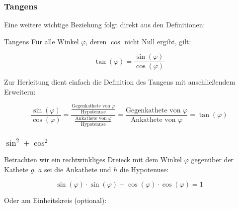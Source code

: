 \subsubsection{Tangens}
Eine weitere wichtige Beziehung folgt direkt aus den Definitionen:

\begin{gesetz}{Tangens}{}
  Für alle Winkel $\varphi$, deren $\cos$ nicht Null ergibt, gilt:

  $$\tan(\varphi) = \frac{\sin(\varphi)}{\cos(\varphi)}$$
  \end{gesetz}
Zur Herleitung dient einfach die Definition des Tangens mit
anschließendem Erweitern:

$$
\frac{\sin(\varphi)}{\cos(\varphi)}
=
\frac{\frac{\text{Gegenkathete von }
    \varphi}{\text{Hypotenuse}}}{\frac{\text{Ankathete von }\varphi}{\text{Hypotenuse}}}
=
\frac{\text{Gegenkathete von
  }\varphi}{\text{Ankathete von }\varphi}
= \tan(\varphi)$$


\newpage


\subsubsection{$\sin^2 + \cos^2$}
Betrachten wir ein rechtwinkliges Dreieck mit dem Winkel $\varphi$
gegenüber der Kathete $g$. $a$ sei die Ankathete und $h$ die
Hypotenuse:





\begin{gesetz}{}{}
  $$\sin(\varphi)\cdot \sin(\varphi) + \cos(\varphi) \cdot
  \cos(\varphi) = 1$$
\end{gesetz}
Oder am Einheitskreis (optional):

